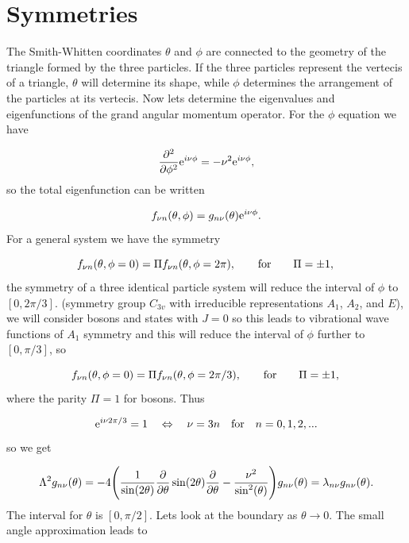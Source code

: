 \section{Symmetries}
The Smith-Whitten coordinates $\theta$ and $\phi$ are connected to the geometry of the triangle formed by the three particles. If the three particles represent the vertecis of a triangle, $\theta$ will determine its shape, while $\phi$ determines the arrangement of the particles at its vertecis. Now lets determine the eigenvalues and eigenfunctions of the grand angular momentum operator. For the $\phi$ equation we have

\begin{equation}
\frac{\partial^{2}}{\partial \phi^{2}} \mathrm{e}^{ i \nu \phi} = -\nu^{2} \mathrm{e}^{ i \nu \phi}\\,
\end{equation}
so the total eigenfunction can be written

\begin{equation}
f_{\nu n}(\theta,\phi) = g_{n \nu}(\theta) \mathrm{e}^{ i \nu \phi}\\. 
\end{equation}
For a general system we have the symmetry 

\begin{equation}
f_{\nu n}(\theta,\phi = 0) = \Pi f_{\nu n}(\theta,\phi = 2\pi), \qquad \text{for} \qquad \Pi = \pm 1,\\
\end{equation}
the symmetry of a three identical particle system will reduce the interval of $\phi$ to $[0,2\pi/3]$. (symmetry group $C_{3v}$ with irreducible representations $A_{1}$, $A_{2}$, and $E$), we will consider bosons and states with $J=0$ so this leads to vibrational wave functions of $A_{1}$ symmetry and this will reduce the interval of $\phi$ further to $[0,\pi/3]$, so

\begin{equation}
f_{\nu n}(\theta,\phi = 0) = \Pi f_{\nu n}(\theta,\phi =2 \pi/3),  \qquad \text{for} \qquad  \Pi = \pm 1,\\
\end{equation}
where the parity $\Pi = 1$ for bosons. Thus

\begin{equation}
\mathrm{e}^{ i \nu 2\pi/3} = 1 \quad \Leftrightarrow  \quad \nu = 3n \quad \text{for} \quad n=0,1,2,...\\
\end{equation}
so we get

\begin{equation}
\Lambda^{2} g_{n \nu}(\theta) = -4\Bigg(\frac{1}{\sin(2\theta)} \frac{\partial}{\partial \theta} \sin(2\theta) \frac{\partial}{\partial \theta} - \frac{\nu^{2}}{\sin^{2}(\theta)}\Bigg) g_{n \nu}(\theta) = \lambda_{n \nu} g_{n \nu}(\theta).\\
\end{equation}
The interval for $\theta$ is $[0,\pi/2]$. Lets look at the boundary as $\theta \rightarrow 0$. The small angle approximation leads to

